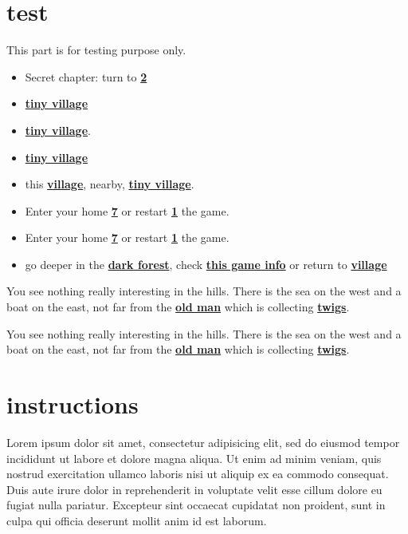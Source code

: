 \documentclass[openany]{book} %
\begin{document}
\begin{LARGE}
\hypertarget{test}{}
\pagebreak[\PAGExBREAKxPOLICY]
\chapter{test}

This part is for testing purpose only.

\begin{itemize}
\item Secret chapter: turn to \textbf{\href{\#2}{2}}

\item \textbf{\href{\#village}{tiny village}} 
\item \textbf{\href{\#village}{tiny village}}.
\item \textbf{\href{\#village}{tiny village}}
\item this \textbf{\href{\#village}{village}}, nearby, \textbf{\href{\#village}{tiny village}}.

\item Enter your home \textbf{\href{\#7}{7}} or restart \textbf{\href{\#1}{1}} the game.
\item Enter your home \textbf{\href{\#7}{7}} or restart \textbf{\href{\#1}{1}} the game.
\item go deeper in the \textbf{\href{\#forest\_ref\_01}{dark forest}}, check \textbf{\href{\#game}{this game info}} or return to \textbf{\href{\#village}{village}}
\end{itemize}

You see nothing really interesting in the hills. There is the sea on the west and a boat on the east, not far from the \textbf{\href{\#man}{old man}} which is collecting \textbf{\href{\#8}{twigs}}.

You see nothing really interesting in the hills. There is the sea on the west and a boat on the east, not far from the \textbf{\href{\#man}{old man}} which is collecting \textbf{\href{\#8}{twigs}}.

\hypertarget{instructions}{}
\pagebreak[\PAGExBREAKxPOLICY]
\chapter{instructions}

Lorem ipsum dolor sit amet, consectetur adipisicing elit, sed do eiusmod tempor incididunt ut labore et dolore magna aliqua. Ut enim ad minim veniam, quis nostrud exercitation ullamco laboris nisi ut aliquip ex ea commodo consequat. Duis aute irure dolor in reprehenderit in voluptate velit esse cillum dolore eu fugiat nulla pariatur. Excepteur sint occaecat cupidatat non proident, sunt in culpa qui officia deserunt mollit anim id est laborum.


\end{LARGE}
\end{document}
